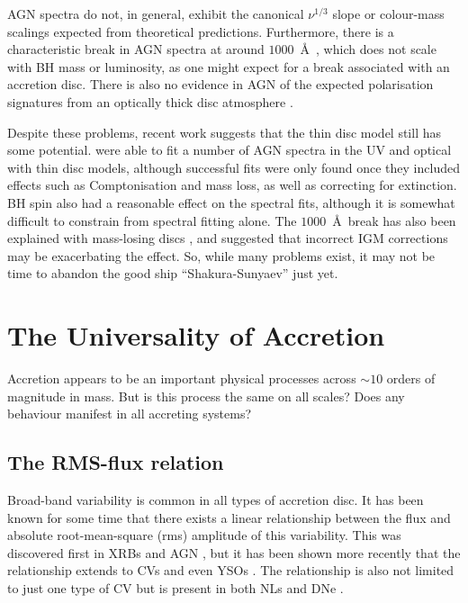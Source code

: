 AGN spectra do not, in general, exhibit the canonical $\nu^{1/3}$ slope
\citep[e.g.][]{koratkar1999,davis2007,shankar2016}
or colour-mass scalings \citep{bonning2007} 
expected from theoretical predictions. 
Furthermore, there is a characteristic break in AGN spectra at
around $1000$~\AA\ \citep{lusso2015}, which does not scale with BH mass or luminosity,
as one might expect for a break associated with an accretion disc. 
There is also no evidence in AGN of the expected polarisation signatures from an 
optically thick disc atmosphere \citep{stockman1979,antonucci1988,antonucci1996}. 

Despite these problems, recent work suggests that the thin disc model 
still has some potential. \cite{capellupo2015} were able to fit a number of
AGN spectra in the UV and optical with thin disc models, although successful fits
were only found once they included effects such as Comptonisation and mass loss,
as well as correcting for extinction. BH spin also had a reasonable effect on the 
spectral fits, although it is somewhat difficult to constrain from spectral 
fitting alone. The $1000$~\AA\ break has also been explained with mass-losing discs 
\citep{laordavis2014},
and \cite{lusso2015} suggested that incorrect IGM corrections 
may be exacerbating the effect.
So, while many problems exist, it may not be time to 
abandon the good ship ``Shakura-Sunyaev'' just yet.

\section{The Universality of Accretion}

Accretion appears to be an important physical processes across $\sim10$ orders
of magnitude in mass. But is this process the same on all scales? Does any 
behaviour manifest in all accreting systems? 

\subsection{The RMS-flux relation}

Broad-band variability is common in all types of accretion disc. It has been
known for some time that there exists a linear relationship
between the flux and absolute root-mean-square (rms) amplitude
of this variability. This was discovered first in XRBs and AGN 
\citep{uttley2001, uttley2005, heil2012}, but it has been shown
more recently that the relationship extends to CVs and even YSOs 
\citep{scaringi2012,scaringi2015a}. The relationship is also not limited
to just one type of CV but is present in both NLs and DNe \citep{vandesande2015}.
 
